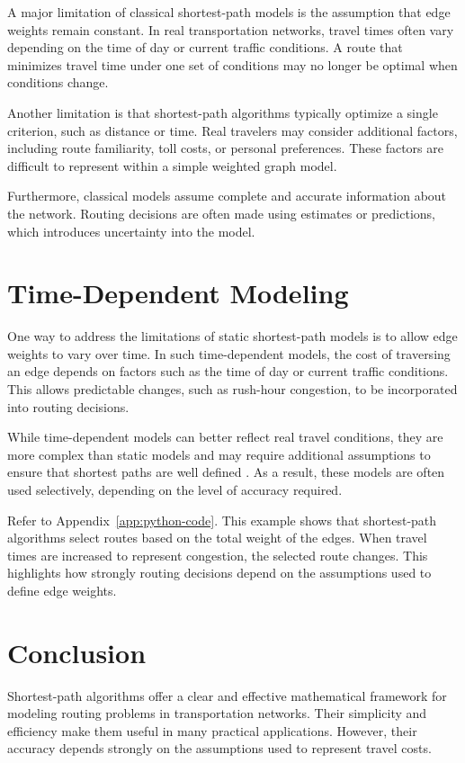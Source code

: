 \documentclass{article}
\begin{document}
A major limitation of classical shortest-path models is the assumption that edge weights remain constant. In real transportation networks, travel times often vary depending on the time of day or current traffic conditions. A route that minimizes travel time under one set of conditions may no longer be optimal when conditions change. 

Another limitation is that shortest-path algorithms typically optimize a single criterion, such as distance or time. Real travelers may consider additional factors, including route familiarity, toll costs, or personal preferences. These factors are difficult to represent within a simple weighted graph model. 

Furthermore, classical models assume complete and accurate information about the network. Routing decisions are often made using estimates or predictions, which introduces uncertainty into the model. 

\section{Time-Dependent Modeling}

One way to address the limitations of static shortest-path models is to allow edge weights to vary over time. In such time-dependent models, the cost of traversing an edge depends on factors such as the time of day or current traffic conditions. This allows predictable changes, such as rush-hour congestion, to be incorporated into routing decisions. 

While time-dependent models can better reflect real travel conditions, they are more complex than static models and may require additional assumptions to ensure that shortest paths are well defined \cite{dean}. As a result, these models are often used selectively, depending on the level of accuracy required.

Refer to Appendix~\ref{app:python-code}. This example shows that shortest-path algorithms select routes based on the total weight of the edges. When travel times are increased to represent congestion, the selected route changes. This highlights how strongly routing decisions depend on the assumptions used to define edge weights. 

\section{Conclusion}

Shortest-path algorithms offer a clear and effective mathematical framework for modeling routing problems in transportation networks. Their simplicity and efficiency make them useful in many practical applications. However, their accuracy depends strongly on the assumptions used to represent travel costs. 
\end{document}
